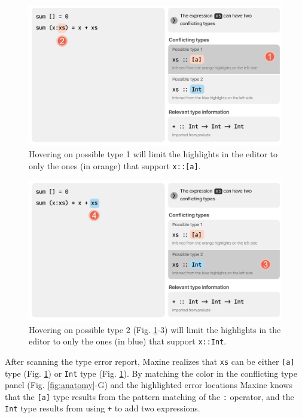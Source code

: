 \begin{figure}[h]
        \centering
        \includegraphics[width=\linewidth]{images/basic-mode-2.pdf}
        \caption{
       Hovering on possible type 1 will limit the highlights 
       in the editor to only the ones (in orange) that support \texttt{x::[a]}.
        }
        \label{fig:basic-mode-2}
\end{figure}

\begin{figure}
        \centering
        \includegraphics[width=\linewidth]{images/basic-mode-3.pdf}
        \caption{
            Hovering on possible type 2 (Fig. \ref{fig:basic-mode-2}-3) will limit the highlights 
            in the editor to only the ones (in blue) that support \texttt{x::Int}.
        }
        \label{fig:basic-mode-3}
\end{figure}





After scanning the type error report, Maxine realizes that \texttt{xs} can be
either \texttt{[a]} type (Fig. \ref{fig:basic-mode-2}) or \texttt{Int} type (Fig. \ref{fig:basic-mode-2}). By matching the color in the
conflicting type panel (Fig. \ref{fig:anatomy}-G) and the highlighted error locations 
Maxine knows that the \texttt{[a]} type results from the pattern matching of the
\texttt{:} operator, and the \texttt{Int} type results from using \texttt{+} to
 add two expressions. 


